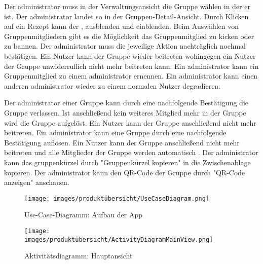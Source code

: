 \documentclass[parskip=full]{scrartcl}
\begin{document}
Der \Gls{administrator} muss in der Verwaltungsansicht die Gruppe wählen in der er  ist.
Der \Gls{administrator} landet so in der Gruppen-Detail-Ansicht.
Durch Klicken auf ein Rezept kann der ,   \gls{ausblenden} und   \gls{einblenden}.\newline
Beim Auswählen von Gruppenmitgliedern gibt es die Möglichkeit das Gruppenmitglied zu \gls{kicken} oder zu \gls{bannen}.
Der \Gls{administrator} muss die jeweilige Aktion nachträglich nochmal bestätigen.
Ein  Nutzer kann der Gruppe wieder beitreten wohingegen ein  Nutzer der Gruppe unwiderruflich nicht mehr beitreten kann.
Ein \Gls{administrator} kann ein Gruppenmitglied zu einem \Gls{administrator} ernennen.
Ein \Gls{administrator} kann einen anderen \Gls{administrator} wieder zu einem normalen Nutzer degradieren.

Der \Gls{administrator} einer Gruppe kann durch eine nachfolgende Bestätigung die Gruppe verlassen.
Ist anschließend kein weiteres Mitglied mehr in der Gruppe wird die Gruppe aufgelöst. Ein Nutzer kann der Gruppe anschließend nicht mehr beitreten.
Ein \Gls{administrator} kann eine Gruppe durch eine nachfolgende Bestätigung auflösen. Ein Nutzer kann der Gruppe anschließend nicht mehr beitreten und alle Mitglieder der Gruppe werden automatisch .\newline
Der \Gls{administrator} kann das \gls{gruppenkürzel} durch "Gruppenkürzel kopieren" in die Zwischenablage kopieren. Der \Gls{administrator} kann den QR-Code der Gruppe durch "QR-Code anzeigen" anschauen.

\newpage

\begin{figure}[!htp]
    \centering
    \begin{adjustbox}{right=160mm}
        \texttt{[image: images/produktübersicht/UseCaseDiagram.png]}
    \end{adjustbox}
    \caption{Use-Case-Diagramm: Aufbau der App}
    \label{fig:UseCaseDiagram}
\end{figure}
\newpage

\begin{figure}[!htp]
    \centering
    \texttt{[image: images/produktübersicht/ActivityDiagramMainView.png]}
    \caption{Aktivitätsdiagramm: Hauptansicht}
    \label{fig:ActivityDiagramMainView}
\end{figure}
\newpage
\end{document}
